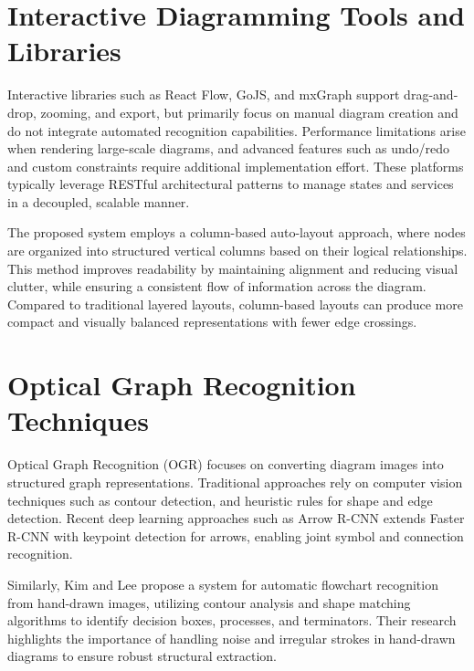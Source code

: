 \section{Interactive Diagramming Tools and Libraries}
\label{sec:diagramming-tools}
Interactive libraries such as React Flow, GoJS, and mxGraph support 
drag-and-drop, zooming, and export, but primarily focus on manual 
diagram creation and do not integrate automated recognition capabilities. 
Performance limitations arise when rendering large-scale diagrams, and 
advanced features such as undo/redo and custom constraints require 
additional implementation effort. These platforms typically leverage RESTful architectural patterns to manage states and services in a decoupled, scalable manner.~\cite{rest}

The proposed system employs a column-based auto-layout approach, 
where nodes are organized into structured vertical columns based on 
their logical relationships. This method improves readability by 
maintaining alignment and reducing visual clutter, while ensuring 
a consistent flow of information across the diagram. Compared to 
traditional layered layouts, column-based layouts can produce more 
compact and visually balanced representations with fewer edge 
crossings.~\cite{diagram-survey}

\section{Optical Graph Recognition Techniques}
\label{sec:ogr}

Optical Graph Recognition (OGR) focuses on converting diagram images 
into structured graph representations. Traditional approaches rely 
on computer vision techniques such as contour detection, and heuristic rules for shape and edge detection. Recent deep learning approaches such as Arrow R-CNN extends Faster R-CNN with keypoint detection for arrows, enabling joint symbol and connection recognition.~\cite{arrow-rcnn}

Similarly, Kim and Lee propose a system for automatic flowchart 
recognition from hand-drawn images, utilizing contour analysis and 
shape matching algorithms to identify decision boxes, processes, 
and terminators. Their research highlights the importance of 
handling noise and irregular strokes in hand-drawn diagrams to 
ensure robust structural extraction.~\cite{flowchart-analysis}

